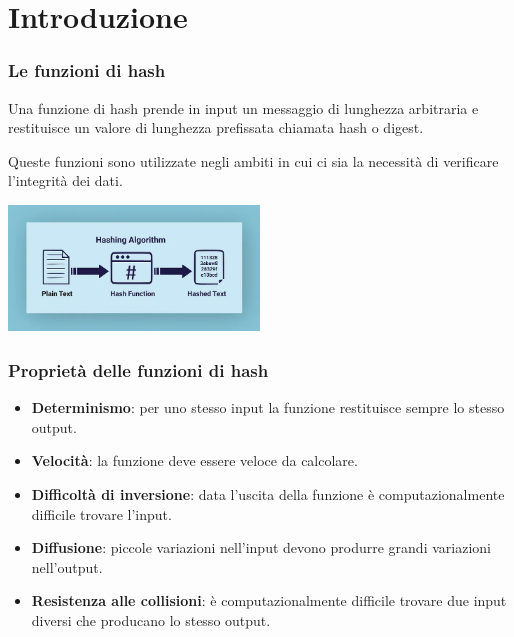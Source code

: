 
\section{Introduzione} %


\begin{frame}
\frametitle{Le funzioni di hash}

Una funzione di hash prende in input un messaggio di lunghezza arbitraria e restituisce un valore di lunghezza prefissata chiamata hash o digest.

Queste funzioni sono utilizzate negli ambiti in cui ci sia la necessità di verificare l'integrità dei dati.
\vspace{1cm}
\begin{center}
    \includegraphics[width=0.5\textwidth]{img/1-img/hash-function.jpeg}
\end{center}
    

\end{frame}


\begin{frame}
\frametitle{Proprietà delle funzioni di hash}

\begin{itemize}
    \item \textbf{Determinismo}: per uno stesso input la funzione restituisce sempre lo stesso output.
    \item \textbf{Velocità}: la funzione deve essere veloce da calcolare.
    \item \textbf{Difficoltà di inversione}: data l'uscita della funzione è computazionalmente difficile trovare l'input.
    \item \textbf{Diffusione}: piccole variazioni nell'input devono produrre grandi variazioni nell'output.
    \item \textbf{Resistenza alle collisioni}: è computazionalmente difficile trovare due input diversi che producano lo stesso output.
\end{itemize}
\end{frame}


